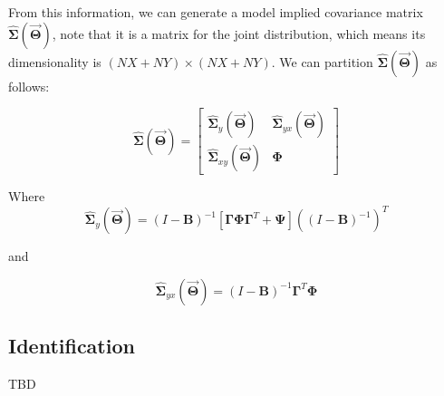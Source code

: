 \documentclass{article}
\begin{document}
\begin{multicols*}{2}
From this information, we can generate a model implied covariance matrix $\hat{\mathbf{\Sigma}}(\mathbf{\vec{\Theta}})$, note that it is a matrix for the joint distribution, which means its dimensionality is $(NX+NY) \times (NX+NY)$. We can partition $\hat{\mathbf{\Sigma}}(\mathbf{\vec{\Theta}})$ as follows:

\[
\hat{\mathbf{\Sigma}}(\mathbf{\vec{\Theta}}) = 
\left[
    \begin{array}{c|c}
        \hat{\mathbf{\Sigma}}_y(\mathbf{\vec{\Theta}}) & 
        \hat{\mathbf{\Sigma}}_{yx}(\mathbf{\vec{\Theta}})\\
        \hline
        \hat{\mathbf{\Sigma}}_{xy}(\mathbf{\vec{\Theta}}) &
        \mathbf{\Phi}
    \end{array}
\right]
\]

Where 
\[
\hat{\mathbf{\Sigma}}_y(\mathbf{\vec{\Theta}})
= (I - \mathbf{B})^{-1}
\left[
\mathbf{\Gamma}\mathbf{\Phi}\mathbf{\Gamma}^T 
+ \mathbf{\Psi}
\right]
((I - \mathbf{B})^{-1})^T
\]

and 

\[
\hat{\mathbf{\Sigma}}_{yx}(\mathbf{\vec{\Theta}})
= (I - \mathbf{B})^{-1}\mathbf{\Gamma}^T\mathbf{\Phi}
\]

\subsection{Identification}

TBD

\end{multicols*}
\end{document}
